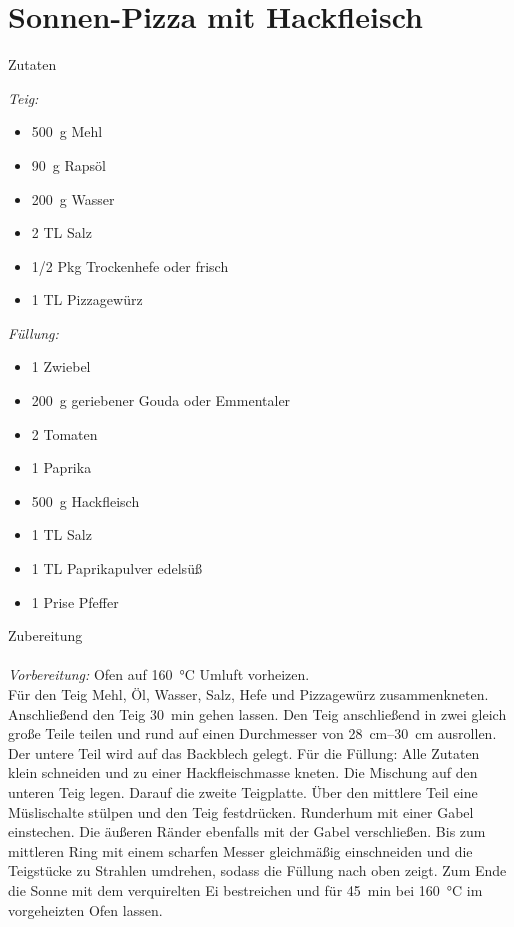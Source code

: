 \section*{Sonnen-Pizza mit Hackfleisch}
\ihead{}\ohead{}
\cfoot{}
{\Large Zutaten}
\begin{multicols}{2}
\textit{Teig:}
\begin{itemize}
    \item \SI{500}{g} Mehl
    \item \SI{90}{g} Rapsöl
    \item \SI{200}{g} Wasser
    \item \num{2} TL Salz
    \item \num{1/2} Pkg Trockenhefe oder frisch
    \item \num{1} TL Pizzagewürz
\end{itemize}
\textit{Füllung:}
\begin{itemize}
    \item \num{1} Zwiebel
    \item \SI{200}{g} geriebener Gouda oder Emmentaler
    \item \num{2} Tomaten
    \item \num{1} Paprika
    \item \SI{500}{g} Hackfleisch
    \item \num{1} TL Salz
    \item \num{1} TL Paprikapulver edelsüß
    \item \num{1} Prise Pfeffer
\end{itemize}
\end{multicols}
\noindent
{\Large Zubereitung}\\
\\
\textit{Vorbereitung:} Ofen auf \SI{160}{\celsius} Umluft vorheizen.\\
Für den Teig Mehl, Öl, Wasser, Salz, Hefe und Pizzagewürz zusammenkneten.
Anschließend den Teig \SI{30}{min} gehen lassen.
Den Teig anschließend in zwei gleich große Teile teilen und rund auf einen Durchmesser von \SIrange{28}{30}{cm}  ausrollen.
Der untere Teil wird auf das Backblech gelegt.
Für die Füllung: Alle Zutaten klein schneiden und zu einer Hackfleischmasse kneten. 
Die Mischung auf den unteren Teig legen.
Darauf die zweite Teigplatte.
Über den mittlere Teil eine Müslischalte stülpen und den Teig festdrücken.
Runderhum mit einer Gabel einstechen. 
Die äußeren Ränder ebenfalls mit der Gabel verschließen.
Bis zum mittleren Ring mit einem scharfen Messer gleichmäßig einschneiden und die Teigstücke zu Strahlen umdrehen, sodass die Füllung nach oben zeigt.
Zum Ende die Sonne mit dem verquirelten Ei bestreichen und für \SI{45}{min} bei \SI{160}{\celsius} im vorgeheizten Ofen lassen.
